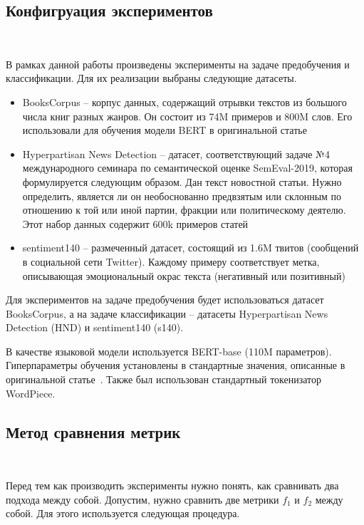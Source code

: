 \documentclass{spbau-diploma}
\begin{document}
\subsection{Конфигруация экспериментов}
\ 

В рамках данной работы произведены эксперименты на задаче предобучения и классификации. Для их реализации выбраны следующие датасеты.

\begin{itemize}
	\item BooksCorpus -- корпус данных, содержащий отрывки текстов из большого числа книг разных жанров. Он состоит из 74M примеров и 800M слов. Его использовали для обучения модели BERT в оригинальной статье~\cite{devlin2018bert}
	\item Hyperpartisan News Detection -- датасет, соответствующий задаче №4 международного семинара по семантической оценке SemEval-2019, которая формулируется следующим образом. Дан текст новостной статьи. Нужно определить, является ли он необоснованно предвзятым или склонным по отношению к той или иной партии, фракции или политическому деятелю. Этот набор данных содержит 600k примеров статей
	\item sentiment140 -- размеченный датасет, состоящий из 1.6M твитов (сообщений в социальной сети Twitter). Каждому примеру соответствует метка, описывающая эмоциональный окрас текста (негативный или позитивный)
\end{itemize}

Для экспериментов на задаче предобучения будет использоваться датасет BooksCorpus, а на задаче классификации -- датасеты Hyperpartisan News Detection (HND) и sentiment140 (s140).

В качестве языковой модели используется BERT-base (110M параметров). Гиперпараметры обучения установлены в стандартные значения, описанные в оригинальной статье~\cite{devlin2018bert}. Также был использован стандартный токенизатор WordPiece.

\subsection{Метод сравнения метрик}
\ 

Перед тем как производить эксперименты нужно понять, как сравнивать два подхода между собой. Допустим, нужно сравнить две метрики $f_1$ и $f_2$ между собой. Для этого используется следующая процедура.
\end{document}
